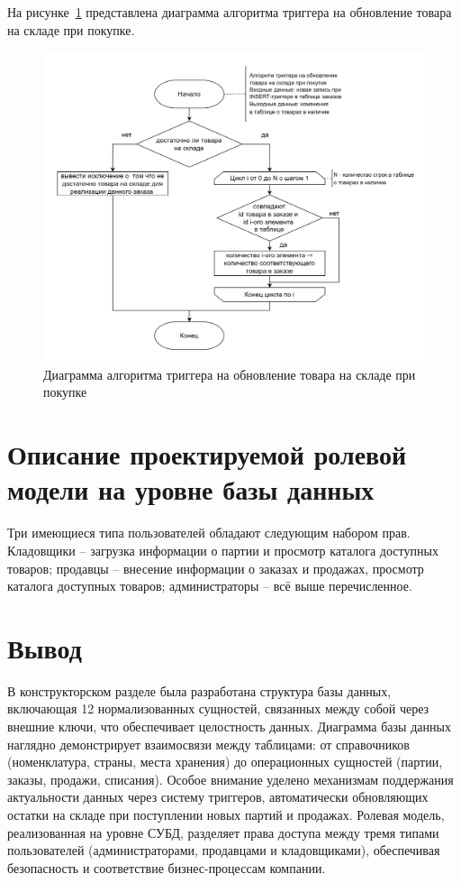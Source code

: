 На рисунке~\ref{fig:trigger2} представлена диаграмма алгоритма триггера на обновление товара на складе при покупке.
\begin{figure}
	\centering
	\includegraphics[width=1\linewidth]{pictures/trigger_2_make_purchase}
	\caption{Диаграмма алгоритма триггера на обновление товара на складе при покупке}
	\label{fig:trigger2}
\end{figure}
\section{Описание проектируемой ролевой модели на уровне базы данных}
Три имеющиеся типа пользователей обладают следующим набором прав. Кладовщики -- загрузка информации  о партии и просмотр каталога доступных товаров; продавцы -- внесение информации о заказах и продажах, просмотр каталога доступных товаров; администраторы -- всё выше перечисленное. 
\section*{Вывод}
В конструкторском разделе была разработана структура базы данных, включающая 12 нормализованных сущностей, связанных между собой через внешние ключи, что обеспечивает целостность данных. Диаграмма базы данных наглядно демонстрирует взаимосвязи между таблицами: от справочников (номенклатура, страны, места хранения) до операционных сущностей (партии, заказы, продажи, списания). Особое внимание уделено механизмам поддержания актуальности данных через систему триггеров, автоматически обновляющих остатки на складе при поступлении новых партий и продажах. Ролевая модель, реализованная на уровне СУБД, разделяет права доступа между тремя типами пользователей (администраторами, продавцами и кладовщиками), обеспечивая безопасность и соответствие бизнес-процессам компании.